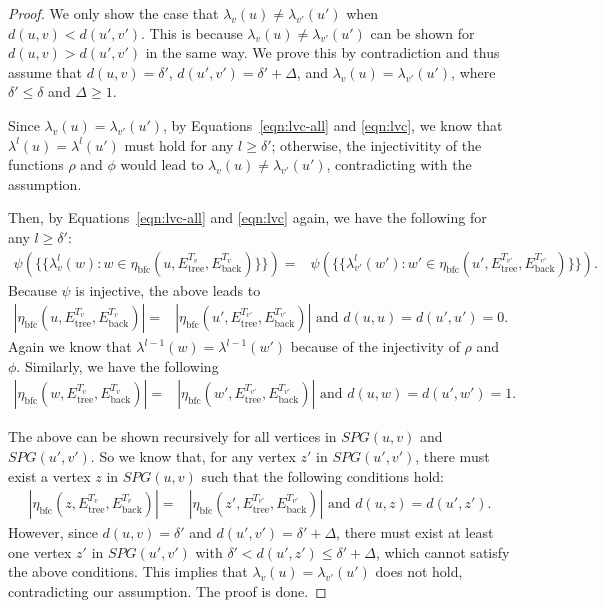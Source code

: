 \begin{proof}
We only show the case that $\lambda_v(u) \neq \lambda_{v'}(u')$ when $d(u,v) < d(u',v')$. This is because $\lambda_v(u) \neq \lambda_{v'}(u')$ can be shown for $d(u,v) > d(u',v')$ in the same way.
We prove this by contradiction and thus assume that $d(u,v)=\delta'$, $d(u',v')=\delta'+\Delta$, and $\lambda_v(u) = \lambda_{v'}(u')$, where $\delta'\leq \delta$ and $\Delta \geq 1$. 

Since $\lambda_v(u) = \lambda_{v'}(u')$, by Equations~\ref{eqn:lvc-all} and \ref{eqn:lvc}, we know that $\lambda^{l}(u) = \lambda^{l}(u')$ must hold for any $l\geq \delta'$; otherwise, the injectivitity of the functions $\rho$ and $\phi$ would lead to $\lambda_v(u) \neq \lambda_{v'}(u')$, contradicting with the assumption.


Then, by Equations~\ref{eqn:lvc-all} and \ref{eqn:lvc} again, we have the following for any $l\geq \delta'$:
\begin{align}
   \psi\left( \{\!\!\{ \lambda^{l}_{v}(w) : w \in \eta_{\text{bfc}}(u, E_{\text{tree}}^{T_v}, E_{\text{back}}^{T_v}) \}\!\!\}\right) = &  \psi\left(\{\!\!\{ \lambda^{l}_{v'}(w') : w' \in \eta_{\text{bfc}}(u', E_{\text{tree}}^{T_{v'}}, E_{\text{back}}^{T_{v'}}) \}\!\!\}\right).
\end{align}
Because $\psi$ is injective, the above leads to
\begin{align}
  |\eta_{\text{bfc}}(u, E_{\text{tree}}^{T_v}, E_{\text{back}}^{T_v})| = &  |\eta_{\text{bfc}}(u', E_{\text{tree}}^{T_{v'}}, E_{\text{back}}^{T_{v'}})| \text{  and  } d(u,u)=d(u',u')=0.
\end{align}
Again we know that $\lambda^{l-1}(w) = \lambda^{l-1}(w')$ because of the injectivity of $\rho$ and $\phi$. Similarly, we have the following 
\begin{align}
  |\eta_{\text{bfc}}(w, E_{\text{tree}}^{T_v}, E_{\text{back}}^{T_v})| = &  |\eta_{\text{bfc}}(w', E_{\text{tree}}^{T_{v'}}, E_{\text{back}}^{T_{v'}})| \text{  and  } d(u,w)=d(u',w')=1.
\end{align}

The above can be shown recursively for all vertices in $SPG(u,v)$ and $SPG(u',v')$. So we know that, for any vertex $z'$ in $SPG(u',v')$, there must exist a vertex $z$ in $SPG(u,v)$ such that the following conditions hold:
\begin{align}
  |\eta_{\text{bfc}}(z, E_{\text{tree}}^{T_v}, E_{\text{back}}^{T_v})| = &  |\eta_{\text{bfc}}(z', E_{\text{tree}}^{T_{v'}}, E_{\text{back}}^{T_{v'}})| \text{  and  } d(u,z)=d(u',z').
\end{align}
However, since $d(u,v)=\delta'$ and $d(u',v')=\delta'+\Delta$, there must exist at least one vertex $z'$ in $SPG(u',v')$ with $\delta'<d(u',z')\leq\delta'+\Delta$, which cannot satisfy the above conditions. This implies that $\lambda_v(u) = \lambda_{v'}(u')$ does not hold, contradicting our assumption. The proof is done.



\end{proof}
